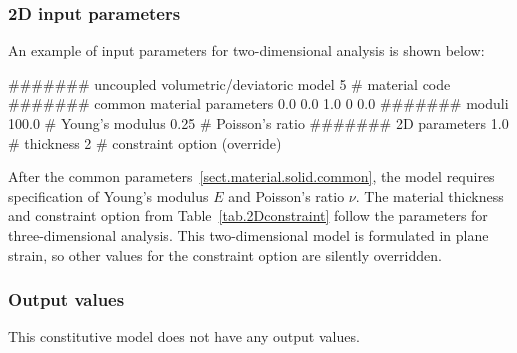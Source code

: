 \subsubsection{2D input parameters}
An example of input parameters for two-dimensional analysis is shown 
below:
\begin{inputfile}
####### uncoupled volumetric/deviatoric model
5     # material code
####### common material parameters
0.0    0.0    1.0
0      0.0
####### moduli
100.0 # Young's modulus
0.25  # Poisson's ratio
####### 2D parameters
1.0   # thickness
2     # constraint option (override)
\end{inputfile}
After the common parameters~\ref{sect.material.solid.common}, the 
model requires specification of Young's modulus $E$ and Poisson's 
ratio $\nu$. The material thickness and 
constraint option from Table~\ref{tab.2Dconstraint} 
follow the parameters for three-dimensional analysis.
This two-dimensional model is formulated in plane strain,
so other values for the constraint option are silently
overridden.

\subsubsection{Output values}
This constitutive model does not have any output values.

